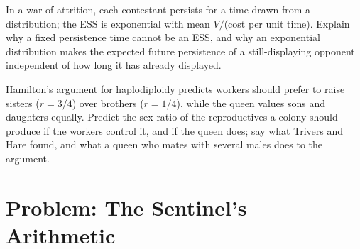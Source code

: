 \begin{exercise}[$\star\star\star$]\label{exo:b3:behavioural-ecology:11}
In a war of attrition, each contestant persists for a time drawn from
a distribution; the ESS is exponential with mean $V/$(cost per unit
time). Explain why a fixed persistence time cannot be an ESS, and why
an exponential distribution makes the expected future persistence of a
still-displaying opponent independent of how long it has already
displayed.
\end{exercise}

\begin{exercise}[$\star\star\star$]\label{exo:b3:behavioural-ecology:12}
Hamilton's argument for haplodiploidy predicts workers should prefer to
raise sisters ($r = 3/4$) over brothers ($r = 1/4$), while the queen
values sons and daughters equally. Predict the sex ratio of the
reproductives a colony should produce if the workers control it, and if
the queen does; say what Trivers and Hare found, and what a queen who
mates with several males does to the argument.
\end{exercise}

\section{Problem: The Sentinel's Arithmetic}

